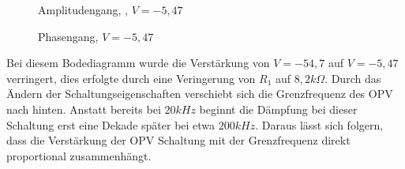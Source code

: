 \begin{figure}[H]
  \centering
  \caption{Amplitudengang, , $V=-5,47$}
\end{figure}
\begin{figure}[H]
  \centering
  \caption{Phasengang, $V=-5,47$}
\end{figure}
\noindent
Bei diesem Bodediagramm wurde die Verst\"arkung von $V=-54,7$ auf $V=-5,47$ verringert, dies erfolgte durch eine Veringerung von $R_1$ auf $8,2k\Omega$. Durch das
\"Andern der Schaltungseigenschaften verschiebt sich die Grenzfrequenz des OPV nach hinten. Anstatt bereits bei $20kHz$ beginnt die D\"ampfung bei dieser Schaltung erst
eine Dekade sp\"ater bei etwa $200kHz$. Daraus l\"asst sich folgern, dass die Verst\"arkung der OPV Schaltung mit der Grenzfrequenz direkt proportional zusammenh\"angt.
